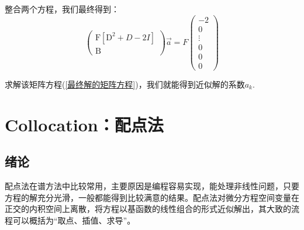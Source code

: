 \documentclass[12pt]{ctexart}
\numberwithin{equation}{section} %
\begin{document}
整合两个方程，我们最终得到：
\begin{equation}
    \left(\begin{array}{c}\mathrm{F}[\mathrm{D}^2+D-2I]\\\mathrm{B}\end{array}\right)\vec{a}=F\left(\begin{array}{c}-2\\0\\\vdots\\0\\0\\0\end{array}\right)
    \label{最终解的矩阵方程}
\end{equation}

求解该矩阵方程(\ref{最终解的矩阵方程})，我们就能得到近似解的系数$a_k$.

\section{Collocation：配点法}
\subsection{绪论}
配点法在谱方法中比较常用，主要原因是编程容易实现，能处理非线性问题，只要方程的解充分光滑，一般都能得到比较满意的结果。配点法对微分方程空间变量在正交的内积空间上离散，将方程以基函数的线性组合的形式近似解出，其大致的流程可以概括为“取点、插值、求导”。
\end{document}
